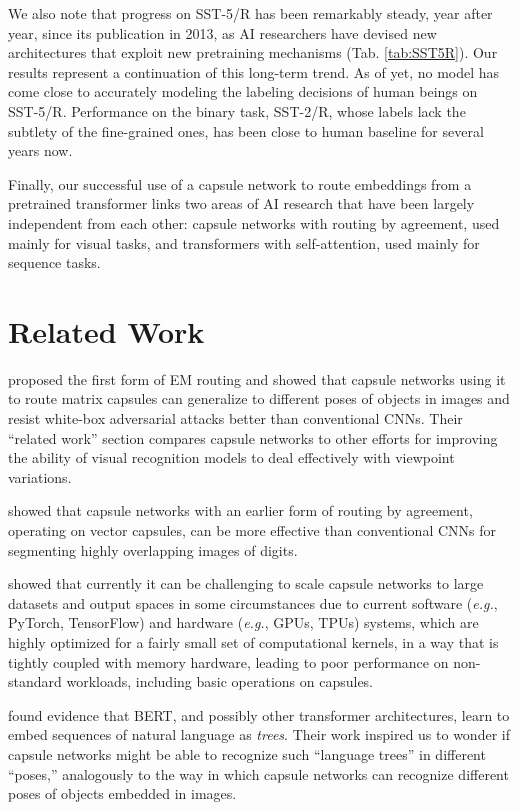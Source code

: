 \documentclass[11pt,a4paper]{article}
\begin{document}
We also note that progress on SST-5/R has been remarkably steady, year after year, since its publication in 2013, as AI researchers have devised new architectures that exploit new pretraining mechanisms (Tab. \ref{tab:SST5R}). Our results represent a continuation of this long-term trend. As of yet, no model has come close to accurately modeling the labeling decisions of human beings on SST-5/R. Performance on the binary task, SST-2/R, whose labels lack the subtlety of the fine-grained ones, has been close to human baseline for several years now.

Finally, our successful use of a capsule network to route embeddings from a pretrained transformer links two areas of AI research that have been largely independent from each other: capsule networks with routing by agreement, used mainly for visual tasks, and transformers with self-attention, used mainly for sequence tasks.

\section{Related Work}\label{related_work}

\citet{46653} proposed the first form of EM routing and showed that capsule networks using it to route matrix capsules can generalize to different poses of objects in images and resist white-box adversarial attacks better than conventional CNNs. Their ``related work'' section compares capsule networks to other efforts for improving the ability of visual recognition models to deal effectively with viewpoint variations.

\citet{DBLP:journals/corr/abs-1710-09829} showed that capsule networks with an earlier form of routing by agreement, operating on vector capsules, can be more effective than conventional CNNs for segmenting highly overlapping images of digits.

\citet{Barham:2019:MLS:3317550.3321441} showed that currently it can be challenging to scale capsule networks to large datasets and output spaces in some circumstances due to current software ({\em e.g.}, PyTorch, TensorFlow) and hardware ({\em e.g.}, GPUs, TPUs) systems, which are highly optimized for a fairly small set of computational kernels, in a way that is tightly coupled with memory hardware, leading to poor performance on non-standard workloads, including basic operations on capsules.

\citet{DBLP:journals/corr/abs-1906-02715} found evidence that BERT, and possibly other transformer architectures, learn to embed sequences of natural language as \emph{trees}. Their work inspired us to wonder if capsule networks might be able to recognize such ``language trees'' in different ``poses,'' analogously to the way in which capsule networks can recognize different poses of objects embedded in images.
\end{document}
